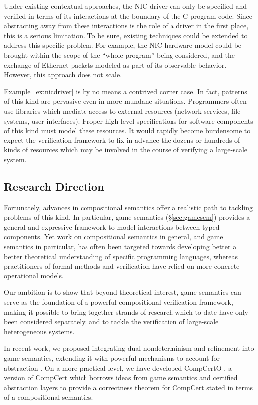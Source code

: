 Under existing contextual approaches, the NIC driver can only be
specified and verified in terms of its interactions at the boundary of
the C program code.  Since abstracting away from these interactions is
the role of a driver in the first place, this is a serious limitation.
To be sure, existing techniques could be extended to address this
specific problem.  For example, the NIC hardware model could be
brought within the scope of the ``whole program'' being considered,
and the exchange of Ethernet packets modeled as part of its observable
behavior.  However, this approach does not scale.

Example~\ref{ex:nicdriver} is by no means a contrived corner case. In
fact, patterns of this kind are pervasive even in more mundane
situations.  Programmers often use libraries which mediate access to
external resources (network services, file systems, user interfaces).
Proper high-level specifications for software components of this kind
must model these resources.  It would rapidly become burdensome to
expect the verification framework to fix in advance the dozens or
hundreds of kinds of resources which may be involved in the course of
verifying a large-scale system.

\subsection{Research Direction}

Fortunately, advances in compositional semantics offer a realistic
path to tackling problems of this kind.  In particular, game semantics
(\S\ref{sec:gamesem}) provides a general and expressive framework to
model interactions between typed components.
Yet work on compositional semantics in general,
and game semantics in particular,
has often been targeted towards developing
better a better theoretical understanding
of specific programming languages,
whereas practitioners of formal methods and verification
have relied on more concrete operational models.

Our ambition is to show that beyond theoretical interest,
game semantics
can serve as the foundation
of a powerful compositional verification framework,
making it possible to bring together strands of research
which to date have only been considered separately,
and to tackle the verification of large-scale heterogeneous systems.

In recent work, we proposed
integrating dual nondeterminism and refinement into game semantics,
extending it with powerful mechanisms to account for abstraction
\cite{koenig20,layered22}.
On a more practical level,
we have developed CompCertO \cite{compcerto},
a version of CompCert which
borrows ideas from game semantics and certified abstraction layers
to provide a correctness theorem for CompCert
stated in terms of a compositional semantics.

